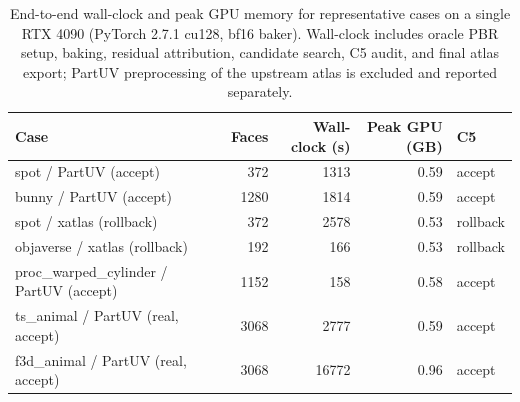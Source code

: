 \begin{table}[t]
\centering
\scriptsize
\caption{End-to-end wall-clock and peak GPU memory for representative cases on a single RTX 4090 (PyTorch 2.7.1 cu128, bf16 baker). Wall-clock includes oracle PBR setup, baking, residual attribution, candidate search, C5 audit, and final atlas export; PartUV preprocessing of the upstream atlas is excluded and reported separately.}
\label{tab:runtime}
\begin{tabular}{@{}lrrrl@{}}
\toprule
Case & Faces & Wall-clock (s) & Peak GPU (GB) & C5 \\
\midrule
spot / PartUV (accept) & 372 & 1313 & 0.59 & accept \\
bunny / PartUV (accept) & 1280 & 1814 & 0.59 & accept \\
spot / xatlas (rollback) & 372 & 2578 & 0.53 & rollback \\
objaverse / xatlas (rollback) & 192 & 166 & 0.53 & rollback \\
proc\_warped\_cylinder / PartUV (accept) & 1152 & 158 & 0.58 & accept \\
ts\_animal / PartUV (real, accept) & 3068 & 2777 & 0.59 & accept \\
f3d\_animal / PartUV (real, accept) & 3068 & 16772 & 0.96 & accept \\
\bottomrule
\end{tabular}
\end{table}
